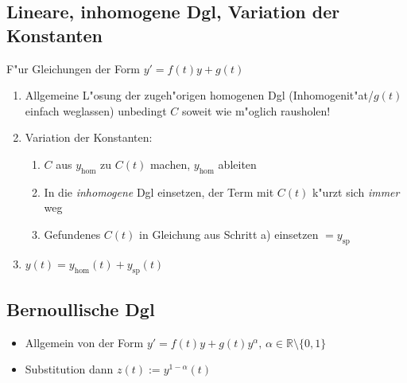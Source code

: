 \documentclass[fleqn,12pt]{scrartcl}
\begin{document}
\subsection{Lineare, inhomogene Dgl, Variation der Konstanten}
F"ur Gleichungen der Form $y' = f(t)y + g(t)$
\begin{enumerate}
	\item
		Allgemeine L"osung der zugeh"origen homogenen Dgl (Inhomogenit"at/$g(t)$ einfach weglassen) unbedingt $C$ soweit wie m"oglich rausholen!
	\item
		Variation der Konstanten:
		\begin{enumerate}
			\item
				$C$ aus $y_\text{hom}$ zu $C(t)$ machen, $y_\text{hom}$ ableiten
			\item
				In die \emph{inhomogene} Dgl einsetzen, der Term mit $C(t)$ k"urzt sich \emph{immer} weg
			\item
				Gefundenes $C(t)$ in Gleichung aus Schritt a) einsetzen $= y_\text{sp}$
		\end{enumerate}
	\item
		$y(t) = y_\text{hom}(t) + y_\text{sp}(t)$
\end{enumerate}



\subsection{Bernoullische Dgl}
\begin{itemize}
	\item
		Allgemein von der Form $y' = f(t)y + g(t) y^\alpha,\, \alpha \in \mathbb{R}\setminus\{0,1\}$
	\item
		Substitution dann $z(t) := y^{1-\alpha}(t)$
\end{itemize}
\end{document}
